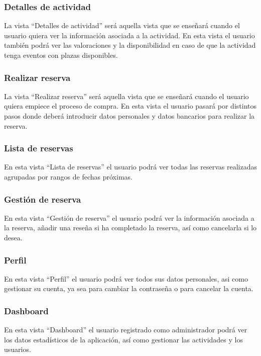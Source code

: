 \subsubsection{Detalles de actividad}
La vista “Detalles de actividad” será aquella vista que se enseñará cuando el usuario quiera ver la información asociada a la actividad. En esta vista el usuario también podrá ver las valoraciones y la disponibilidad en caso de que la actividad tenga eventos con plazas disponibles.

\subsubsection{Realizar reserva}
La vista “Realizar reserva” será aquella vista que se enseñará cuando el usuario quiera empiece el proceso de compra. En esta vista el usuario pasará por distintos pasos donde deberá introducir datos personales y datos bancarios para realizar la reserva.

\subsubsection{Lista de reservas}
En esta vista “Lista de reservas” el usuario podrá ver todas las reservas realizadas agrupadas por rangos de fechas próximas.

\subsubsection*{Gestión de reserva}
En esta vista “Gestión de reserva” el usuario podrá ver la información asociada a la reserva, añadir una reseña si ha completado la reserva, así como cancelarla si lo desea.

\subsubsection{Perfil}
En esta vista “Perfil” el usuario podrá ver todos sus datos personales, asi como gestionar su cuenta, ya sea para cambiar la contraseña o para cancelar la cuenta.

\subsubsection{Dashboard}
En esta vista “Dashboard” el usuario registrado como administrador podrá ver los datos estadísticos de la aplicación, así como gestionar las actividades y los usuarios.

